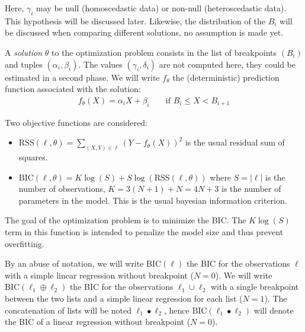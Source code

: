                 Here, \(\gamma_i\) may be null (homoscedastic data) or non-null (heteroscedastic data). This hypothesis
                will be discussed later. Likewise, the distribution of the \(B_i\) will be discussed when comparing
                different solutions, no assumption is made yet.

                A \emph{solution} \(\theta\) to the optimization problem consists in the list of breakpoints \((B_i)\)
                and tuples \((\alpha_i,\beta_i)\). The values \((\gamma_i, \delta_i)\) are not computed here, they could
                be estimated in a second phase. We will write \(f_\theta\) the (deterministic) prediction function
                associated with the solution:
                \begin{align}
                    f_{\theta}(X) = \alpha_i X + \beta_i
                        && \text{ if } B_i \leq X < B_{i+1}
                \end{align}

                Two objective functions are considered:
                \begin{itemize}
                    \item \(\text{RSS}(\ell, \theta) = \sum_{(X,Y)\in\ell} (Y-f_\theta(X))^2\) is the usual residual sum
                        of squares.
                    \item \(\text{BIC}(\ell, \theta) = K\log(S) + S\log(\text{RSS}(\ell, \theta))\) where \(S=|\ell|\)
                        is the number of observations, \(K = 3(N+1)+N = 4N+3\) is the number of parameters in the
                        model. This is the usual bayesian information criterion.
                \end{itemize}

                The goal of the optimization problem is to minimize the BIC. The \(K\log(S)\) term in this function is
                intended to penalize the model size and thus prevent overfitting.

                By an abuse of notation, we will write \(\text{BIC}(\ell)\) the BIC for the observations \(\ell\) with a
                simple linear regression without breakpoint (\ie \(N=0\)). We will write
                \(\text{BIC}(\ell_1\oplus\ell_2)\) the BIC for the observations \(\ell_1 \cup \ell_2\) with a single
                breakpoint between the two lists and a simple linear regression for each list (\ie \(N=1\)).
                The concatenation of lists will be noted \(\ell_1 \bullet \ell_2\), hence
                \(\text{BIC}(\ell_1\bullet\ell_2)\) will denote the BIC of a linear regression without breakpoint
                (\(N=0\)).

